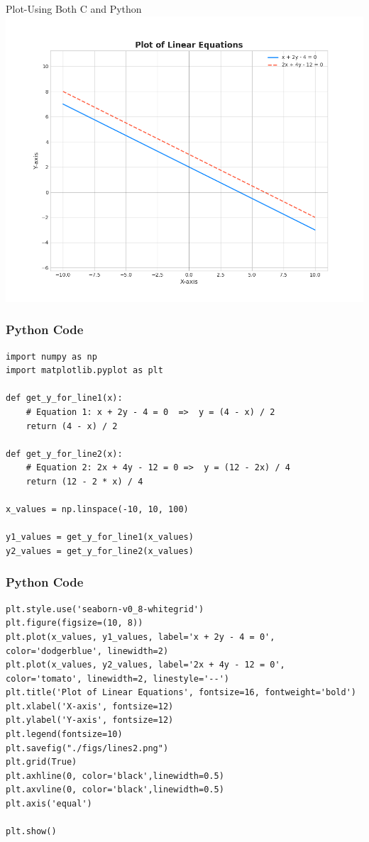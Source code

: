 \documentclass{beamer}
\begin{document}
\begin{frame}{Plot-Using Both C and Python}
    \centering
    \includegraphics[width=\columnwidth, height=0.8\textheight, keepaspectratio]{figs/lines.png}     
\end{frame}

\begin{frame}[fragile]
    \frametitle{Python Code}
    \begin{lstlisting}
import numpy as np
import matplotlib.pyplot as plt

def get_y_for_line1(x):
    # Equation 1: x + 2y - 4 = 0  =>  y = (4 - x) / 2
    return (4 - x) / 2

def get_y_for_line2(x):
    # Equation 2: 2x + 4y - 12 = 0 =>  y = (12 - 2x) / 4
    return (12 - 2 * x) / 4

x_values = np.linspace(-10, 10, 100)

y1_values = get_y_for_line1(x_values)
y2_values = get_y_for_line2(x_values)
\end{lstlisting}
\end{frame}
\begin{frame}[fragile]
    \frametitle{Python Code}
    \begin{lstlisting}
plt.style.use('seaborn-v0_8-whitegrid')
plt.figure(figsize=(10, 8))
plt.plot(x_values, y1_values, label='x + 2y - 4 = 0', color='dodgerblue', linewidth=2)
plt.plot(x_values, y2_values, label='2x + 4y - 12 = 0', color='tomato', linewidth=2, linestyle='--')
plt.title('Plot of Linear Equations', fontsize=16, fontweight='bold')
plt.xlabel('X-axis', fontsize=12)
plt.ylabel('Y-axis', fontsize=12)
plt.legend(fontsize=10)
plt.savefig("./figs/lines2.png") 
plt.grid(True)
plt.axhline(0, color='black',linewidth=0.5)
plt.axvline(0, color='black',linewidth=0.5)
plt.axis('equal')

plt.show()
\end{lstlisting}
\end{frame}
\end{document}

